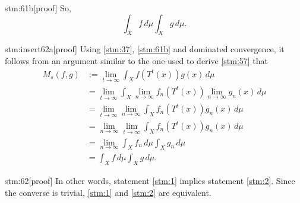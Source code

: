 \begin{stm}{stm:61b}[proof]
So,
\[
\int_X f \, d\mu \int_X g \, d\mu.
\]
\end{stm}

\begin{stm}{stm:insert62a}[proof]
Using \ref{stm:37}, \ref{stm:61b} and dominated convergence, it follows from an argument similar to the one used to derive \ref{stm:57} that
\begin{align*}
M_s(f, g) 
&:= \lim_{t \to \infty} \int_X f(T^t(x)) g(x) \, d\mu \\
&= \lim_{t \to \infty} \int_X \lim_{n \to \infty} f_n(T^t(x)) \lim_{n \to \infty} g_n(x) \, d\mu \\
&= \lim_{t \to \infty} \lim_{n \to \infty} \int_X f_n(T^t(x)) g_n(x) \, d\mu \\
&= \lim_{n \to \infty} \lim_{t \to \infty} \int_X f_n(T^t(x)) g_n(x) \, d\mu \\
&= \lim_{n \to \infty} \int_X f_n \, d\mu \int_X g_n \, d\mu \\
&= \int_X f \, d\mu \int_X g \, d\mu.
\end{align*}
\end{stm}

\begin{stm}{stm:62}[proof]
In other words, statement \ref{stm:1} implies statement \ref{stm:2}. Since the converse is trivial, \ref{stm:1} and \ref{stm:2} are equivalent.
\end{stm}